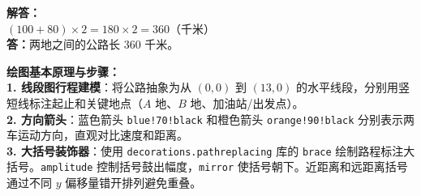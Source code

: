 \vspace{0.6cm}

\noindent
\textbf{解答：}\\
$(100 + 80) \times 2 = 180 \times 2 = 360$（千米）\\[4pt]
\textbf{答：}两地之间的公路长 $360$ 千米。

\vspace{0.6cm}

{\small\color{blue!70!black}
\textbf{绘图基本原理与步骤：}\\
\textbf{1. 线段图行程建模}：将公路抽象为从 $(0,0)$ 到 $(13,0)$ 的水平线段，分别用竖短线标注起止和关键地点（$A$ 地、$B$ 地、加油站/出发点）。\\
\textbf{2. 方向箭头}：蓝色箭头 \texttt{blue!70!black} 和橙色箭头 \texttt{orange!90!black} 分别表示两车运动方向，直观对比速度和距离。\\
\textbf{3. 大括号装饰器}：使用 \texttt{decorations.pathreplacing} 库的 \texttt{brace} 绘制路程标注大括号。\texttt{amplitude} 控制括号鼓出幅度，\texttt{mirror} 使括号朝下。近距离和远距离括号通过不同 $y$ 偏移量错开排列避免重叠。
}

\newpage
